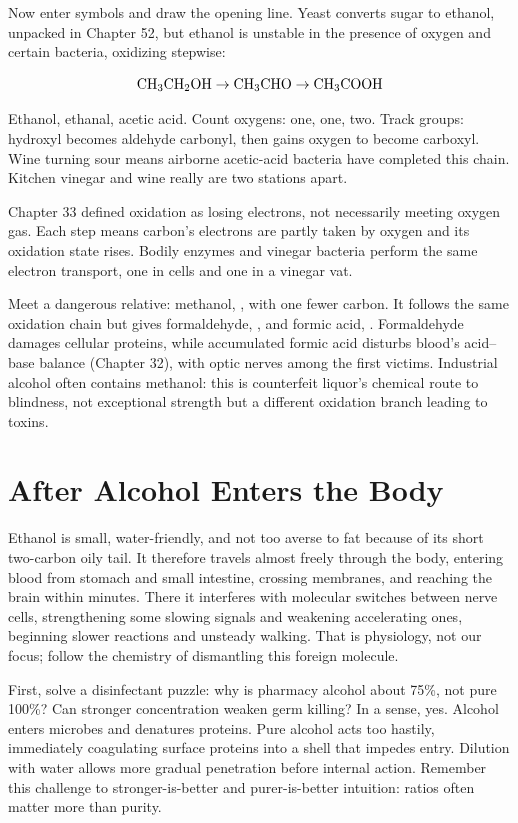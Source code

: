 Now enter symbols and draw the opening line. Yeast converts sugar to ethanol, unpacked in Chapter 52, but ethanol is unstable in the presence of oxygen and certain bacteria, oxidizing stepwise:

\[\mathrm{CH_3CH_2OH} \rightarrow \mathrm{CH_3CHO} \rightarrow \mathrm{CH_3COOH}\]

Ethanol, ethanal, acetic acid. Count oxygens: one, one, two. Track groups: hydroxyl becomes aldehyde carbonyl, then gains oxygen to become carboxyl. Wine turning sour means airborne acetic-acid bacteria have completed this chain. Kitchen vinegar and wine really are two stations apart.

Chapter 33 defined oxidation as losing electrons, not necessarily meeting oxygen gas. Each step means carbon's electrons are partly taken by oxygen and its oxidation state rises. Bodily enzymes and vinegar bacteria perform the same electron transport, one in cells and one in a vinegar vat.

Meet a dangerous relative: methanol, , with one fewer carbon. It follows the same oxidation chain but gives formaldehyde, , and formic acid, . Formaldehyde damages cellular proteins, while accumulated formic acid disturbs blood's acid--base balance (Chapter 32), with optic nerves among the first victims. Industrial alcohol often contains methanol: this is counterfeit liquor's chemical route to blindness, not exceptional strength but a different oxidation branch leading to toxins.

\section{After Alcohol Enters the Body}

Ethanol is small, water-friendly, and not too averse to fat because of its short two-carbon oily tail. It therefore travels almost freely through the body, entering blood from stomach and small intestine, crossing membranes, and reaching the brain within minutes. There it interferes with molecular switches between nerve cells, strengthening some slowing signals and weakening accelerating ones, beginning slower reactions and unsteady walking. That is physiology, not our focus; follow the chemistry of dismantling this foreign molecule.

First, solve a disinfectant puzzle: why is pharmacy alcohol about 75\%, not pure 100\%? Can stronger concentration weaken germ killing? In a sense, yes. Alcohol enters microbes and denatures proteins. Pure alcohol acts too hastily, immediately coagulating surface proteins into a shell that impedes entry. Dilution with water allows more gradual penetration before internal action. Remember this challenge to stronger-is-better and purer-is-better intuition: ratios often matter more than purity.

